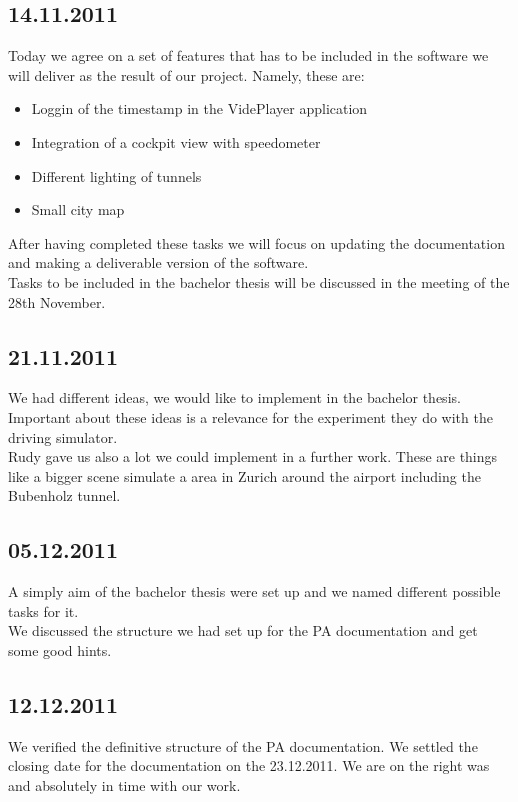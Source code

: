 \subsection*{14.11.2011}
Today we agree on a set of features that has to be included in the software we will deliver as the result of our project. Namely, these are:
\begin{itemize}
\item Loggin of the timestamp in the VidePlayer application
\item Integration of a cockpit view with speedometer
\item Different lighting of tunnels
\item Small city map
\end{itemize}
After having completed these tasks we will focus on updating the documentation and making a deliverable version of the software.\\
Tasks to be included in the bachelor thesis will be discussed in the meeting of the 28th November.
\subsection*{21.11.2011}
We had different ideas, we would like to implement in the bachelor thesis. Important about these ideas is a relevance for the experiment they do with the driving simulator. \\
Rudy gave us also a lot we could implement in a further work. These are things like a bigger scene simulate a area in Zurich around the airport including the Bubenholz tunnel.  
\subsection*{05.12.2011}
A simply aim of the bachelor thesis were set up and we named different possible tasks for it. \\
We discussed the structure we had set up for the PA documentation and get some good hints.
\subsection*{12.12.2011}
We verified the definitive structure of the PA documentation. We settled the closing date for the documentation on the 23.12.2011. We are on the right was and absolutely in time with our work.